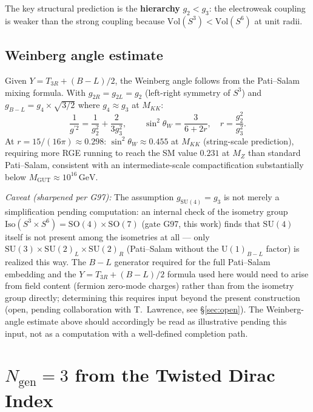 \documentclass[12pt,a4paper]{article}
\newcommand{\Vol}{\mathrm{Vol}}
\begin{document}
The key structural prediction is the \textbf{hierarchy} $g_2<g_3$: the electroweak coupling
is weaker than the strong coupling because $\Vol(S^3)<\Vol(S^6)$ at unit radii.

\subsection{Weinberg angle estimate}
\label{sec:weinberg}

Given $Y = T_{3R} + (B{-}L)/2$, the Weinberg angle follows from the Pati--Salam mixing
formula. With $g_{2R}=g_{2L}=g_2$ (left-right symmetry of $S^3$) and
$g_{B-L}=g_4\times\sqrt{3/2}$ where $g_4\approx g_3$ at $M_{KK}$:
\begin{equation}
  \frac{1}{g^{\prime 2}} = \frac{1}{g_2^2} + \frac{2}{3g_3^2}, \qquad
  \sin^2\theta_W = \frac{3}{6+2r}, \quad r = \frac{g_2^2}{g_3^2}.
\end{equation}
At $r=15/(16\pi)\approx 0.298$: $\sin^2\theta_W\approx 0.455$ at $M_{KK}$ (string-scale
prediction), requiring more RGE running to reach the SM value $0.231$ at $M_Z$ than standard
Pati--Salam, consistent with an intermediate-scale compactification substantially below
$M_{\mathrm{GUT}}\approx 10^{16}\,\mathrm{GeV}$.

\textit{Caveat (sharpened per G97):} The assumption $g_{\mathrm{SU}(4)}=g_3$ is not merely
a simplification pending computation: an internal check of the isometry group
$\mathrm{Iso}(S^3\times S^6)=\mathrm{SO}(4)\times\mathrm{SO}(7)$ (gate G97, this work)
finds that $\mathrm{SU}(4)$ itself is not present among the isometries at all --- only
$\mathrm{SU}(3)\times\mathrm{SU}(2)_L\times\mathrm{SU}(2)_R$ (Pati--Salam without the
$\mathrm{U}(1)_{B-L}$ factor) is realized this way. The $B-L$ generator required for the
full Pati--Salam embedding and the $Y=T_{3R}+(B{-}L)/2$ formula used here would need to
arise from field content (fermion zero-mode charges) rather than from the isometry group
directly; determining this requires input beyond the present construction (open, pending
collaboration with T.~Lawrence, see \S\ref{sec:open}). The Weinberg-angle estimate above
should accordingly be read as illustrative pending this input, not as a computation with
a well-defined completion path.

\section{\texorpdfstring{$N_{\mathrm{gen}}=3$}{Ngen=3} from the Twisted Dirac Index}
\label{sec:ngen}
\end{document}
